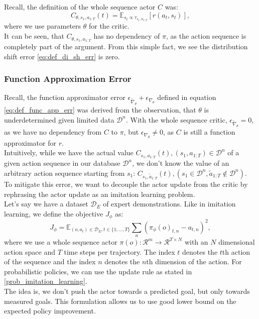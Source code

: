Recall, the definition of the whole sequence actor $C$ was: 
$$C_{\theta, s_1, a_{1:T}}(t) = \mathbb{E}_{s_t \propto \tau_{s_1, a_{1:T}}}\left[r(a_t, s_t)\right],$$
where we use parameters $\theta$ for the critic.\\
It can be seen, that $C_{\theta, s_1, a_{1:T}}$ has no dependency of $\pi$, as the action sequence is completely part of the argument. From this simple fact, we 
see the distribution shift error \ref{eq:def_di_sh_err} is zero. 

\subsubsection{Function Approximation Error}
\label{func_app_error}
Recall, the function approximator error $\epsilon_{\widetilde{\nabla}_{\theta}} + \epsilon_{\nabla_{\theta}}$ defined in equation \ref{eq:def_func_app_err} was 
derived from the observation, that $\theta$ is underdetermined 
given limited data $\mathcal{D}^n$. With the whole sequence critic, $\epsilon_{\widetilde{\nabla}_{\theta}} = 0$, as we have no dependency from $C$ to $\pi$, 
but $\epsilon_{\nabla_{\theta}} \neq 0$, as $C$ is still a function approximator for $r$.\\

Intuitively, while we have the actual value $C_{s_1, a_{1:T}}(t), (s_1, a_{1:T}) \in \mathcal{D}^n$ of a given action sequence in our database $\mathcal{D}^n$, 
we don't know the value of an arbitrary action sequence starting from $s_1$: $C_{s_1, \tilde{a}_{1:T}}(t), (s_1 \in \mathcal{D}^n, \tilde{a}_{1:T} \notin \mathcal{D}^n)$. \\
To mitigate this error, we want to decouple the actor update from the critic by rephrasing the actor update as an imitation learning problem. \\
Let's say we have a dataset $\mathcal{D}_E$ of expert demonstrations. Like in imitation learning, we define the objective $J_{\phi}$ as:
\begin{equation}
    \label{eq:ac_obj_1}
    J_{\phi} = \mathbb{E}_{(o, a_{t}) \in \mathcal{D}_E, t \in \{1, ..., T\}}\sum_n \left(\pi_{\phi}(o)_{t, n} - a_{t, n}\right)^2,
\end{equation}
where we use a whole sequence actor 
$\pi(o):\mathcal{R}^m \rightarrow \mathcal{R}^{T \times N}$ with an $N$ dimensional action space and $T$ time steps per trajectory. The index $t$ denotes the $t$th action of the sequence and the index $n$ denotes the $n$th dimension of 
the action. For probabilistic policies, we can use the update rule as stated in \ref{prob_imitation_learning}.\\ 
The idea is, we don't push the actor towards a predicted goal, 
but only towards measured goals. This formulation allows us to use good lower bound on the expected policy improvement.\\

